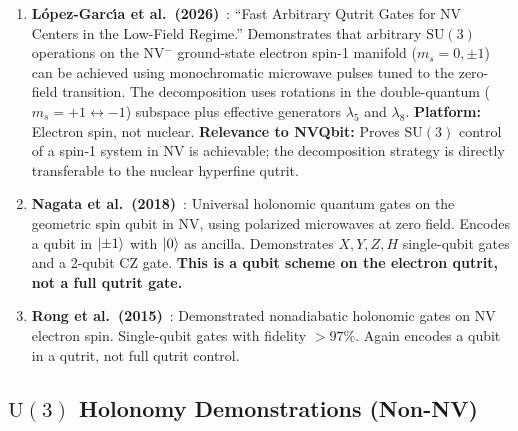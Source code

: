 \documentclass[11pt,letterpaper]{article}
\newcommand{\SU}{\mathrm{SU}}
\newcommand{\UU}{\mathrm{U}}
\begin{document}
\begin{enumerate}[label=(\alph*)]
  \item \textbf{L\'{o}pez-Garc\'{\i}a et al.\ (2026)}~\cite{LopezGarcia2026}:
    ``Fast Arbitrary Qutrit Gates for NV Centers in the Low-Field Regime.'' Demonstrates
    that arbitrary $\SU(3)$ operations on the NV$^-$ ground-state electron spin-1
    manifold ($m_s = 0, \pm 1$) can be achieved using monochromatic microwave pulses
    tuned to the zero-field transition. The decomposition uses rotations in the
    double-quantum ($m_s = +1 \leftrightarrow -1$) subspace plus effective generators
    $\lambda_5$ and $\lambda_8$. \textbf{Platform:} Electron spin, not nuclear.
    \textbf{Relevance to NVQbit:} Proves $\SU(3)$ control of a spin-1 system in NV
    is achievable; the decomposition strategy is directly transferable to the nuclear
    hyperfine qutrit.

  \item \textbf{Nagata et al.\ (2018)}~\cite{Nagata2018}: Universal holonomic quantum
    gates on the geometric spin qubit in NV, using polarized microwaves at zero field.
    Encodes a qubit in $\ket{\pm 1}$ with $\ket{0}$ as ancilla. Demonstrates $X, Y, Z,
    H$ single-qubit gates and a 2-qubit CZ gate. \textbf{This is a qubit scheme on the
    electron qutrit, not a full qutrit gate.}

  \item \textbf{Rong et al.\ (2015)}~\cite{Rong2015}: Demonstrated nonadiabatic holonomic
    gates on NV electron spin. Single-qubit gates with fidelity $> 97\%$. Again encodes %
    a qubit in a qutrit, not full qutrit control.
\end{enumerate}

\subsection{$\UU(3)$ Holonomy Demonstrations (Non-NV)}
\end{document}
